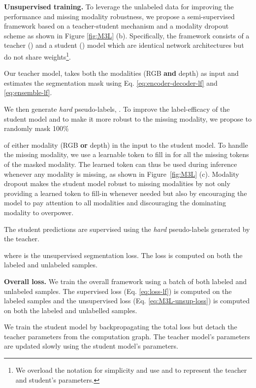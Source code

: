 \documentclass[10pt,twocolumn,letterpaper]{article}
\begin{document}
\noindent\textbf{Unsupervised training.} To leverage the unlabeled data for improving the performance and missing modality robustness, we propose a semi-supervised framework based on a teacher-student mechanism \cite{mt} and a modality dropout scheme as shown in Figure \ref{fig:M3L} (b). Specifically, the framework consists of a teacher () and a student () model which are identical network architectures but do not share weights\footnote{We overload the notation for simplicity and use  and  to represent the teacher and student's parameters.}.

Our teacher model,  takes both the modalities (RGB \textbf{and} depth) as input and estimates the segmentation mask using Eq. \ref{eq:encoder-decoder-lf} and \ref{eq:ensemble-lf}.



We then generate \emph{hard} pseudo-labels, . To improve the label-efficacy of the student model and to make it more robust to the missing modality, we propose to randomly mask 100\% 

of either modality (RGB \textbf{or} depth) in the input to the student model. 
To handle the missing modality, we use a learnable token to fill in for all the missing tokens of the masked modality.
The learned token can thus be used during inference whenever any modality is missing, as shown in Figure~\ref{fig:M3L} (c).
Modality dropout makes the student model robust to missing modalities by not only providing a learned token to fill-in whenever needed but also by encouraging the model to pay attention to all modalities and discouraging the dominating modality to overpower.

The student predictions are supervised using the \emph{hard} pseudo-labels generated by the teacher.

\small{

}
where  is the unsupervised segmentation loss. The loss  is computed on both the labeled and unlabeled samples.

\noindent\textbf{Overall loss.}
We train the overall framework using a batch of both labeled and unlabeled samples. The supervised loss  (Eq. \ref{eq:loss-lf}) is computed on the labeled samples and the unsupervised loss  (Eq. \ref{eq:M3L-unsup-loss}) is computed on both the labeled and unlabelled samples. 


We train the student model by backpropagating the total loss  but detach the teacher parameters from the computation graph. The teacher model's parameters are updated slowly using the student model's parameters. 
\end{document}
